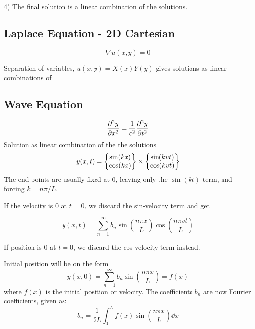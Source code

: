 \documentclass[10pt,a4paper]{article}
\newcommand{\oneinfsum}{\sum_{n=1}^{\infty}}
\begin{document}
\begin{multicols}{2}
4) The final solution is a linear combination of the solutions.


\subsection*{Laplace Equation - 2D Cartesian}
\[
    \nabla u(x,y) = 0
\]

Separation of variables, $u(x,y) = X(x)Y(y)$ gives solutions as linear combinations of


\subsection*{Wave Equation}
\[
    \pdv[2]{y}{x} = \frac{1}{c^2}\pdv[2]{y}{t}
\]
Solution as linear combination of the the solutions
\[
    y(x,t) = \qty{\begin{matrix} \sin(kx) \\ \cos(kx) \end{matrix}} \times \qty{\begin{matrix} \sin(kvt) \\ \cos(kvt) \end{matrix}}
\]
The end-points are usually fixed at 0, leaving only the $\sin(kt)$ term, and forcing $k=n\pi/L$.

If the velocity is 0 at $t=0$, we discard the sin-velocity term and get

\[
    y(x,t) = \oneinfsum b_n\sin(\frac{n\pi x}{L})\cos(\frac{n\pi v t}{L})
\]

If position is 0 at $t=0$, we discard the cos-velocity term instead.

Initial position will be on the form
\[
    y(x,0) = \oneinfsum b_n \sin(\frac{n\pi x}{L}) = f(x)
\]
where $f(x)$ is the initial position or velocity. The coefficients $b_n$ are now Fourier coefficients, given as:
\[
    b_n = \frac{1}{2L}\int_{0}^{L} f(x)\sin(\frac{n\pi x}{L}) \dd{x}
\]

\newpage





\end{multicols}
\end{document}
